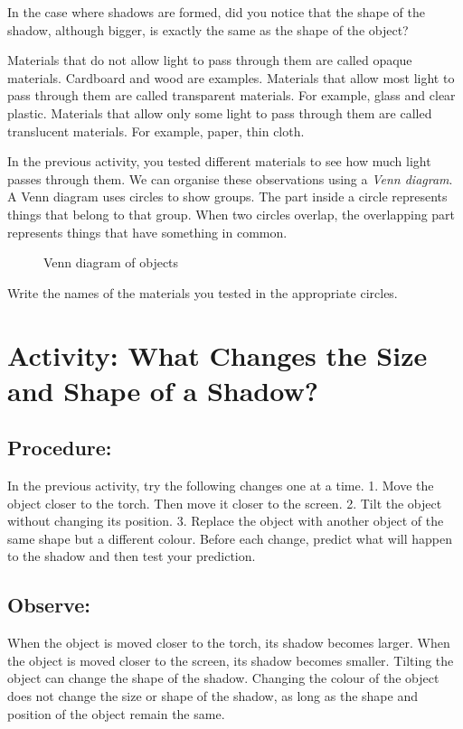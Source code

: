 \documentclass{xtufte-handout}
\begin{document}
In the case where shadows are formed, did you notice that the shape of the shadow, although bigger, is exactly the same as the shape of the object?

Materials that do not allow light to pass through them are called opaque materials. Cardboard and wood are examples. Materials that allow most light to pass through them are called transparent materials. For example, glass and clear plastic. Materials that allow only some light to pass through them are called translucent materials. For example, paper, thin cloth.

In the previous activity, you tested different materials to see how much light passes through them. We can organise these observations using a \emph{Venn diagram}. A Venn diagram uses circles to show groups. The part inside a circle represents things that belong to that group. When two circles overlap, the overlapping part represents things that have something in common.

\begin{figure}[h!]
  \caption{Venn diagram of objects}
\end{figure}
Write the names of the materials you tested in the appropriate circles.

\section{Activity: What Changes the Size and Shape of a Shadow?}
\subsection{Procedure:}
In the previous activity, try the following changes one at a time. 1. Move the object closer to the torch. Then move it closer to the screen. 2. Tilt the object without changing its position. 3. Replace the object with another object of the same shape but a different colour. Before each change, predict what will happen to the shadow and then test your prediction.

\subsection{Observe:} When the object is moved closer to the torch, its shadow becomes larger. When the object is moved closer to the screen, its shadow becomes smaller. Tilting the object can change the shape of the shadow. Changing the colour of the object does not change the size or shape of the shadow, as long as the shape and position of the object remain the same.
\end{document}
